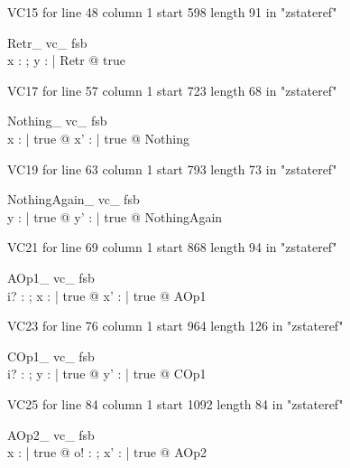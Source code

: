 \documentclass{article}
\begin{document}
VC15 for line 48 column 1 start 598 length 91 in "zstateref"
\begin{theorem}{ Retr\_ vc\_ fsb}\\
 \exists x : \power \nat ; y : \seq \nat | Retr @ true \\

\end{theorem}

VC17 for line 57 column 1 start 723 length 68 in "zstateref"
\begin{theorem}{ Nothing\_ vc\_ fsb}\\
 \forall x : \power \nat | true @ \exists x' : \power \nat | true @ Nothing \\

\end{theorem}

VC19 for line 63 column 1 start 793 length 73 in "zstateref"
\begin{theorem}{ NothingAgain\_ vc\_ fsb}\\
 \forall y : \seq \nat | true @ \exists y' : \seq \nat | true @ NothingAgain \\

\end{theorem}

VC21 for line 69 column 1 start 868 length 94 in "zstateref"
\begin{theorem}{ AOp1\_ vc\_ fsb}\\
 \forall i? : \nat ; x : \power \nat | true @ \exists x' : \power \nat | true @ AOp1 \\

\end{theorem}

VC23 for line 76 column 1 start 964 length 126 in "zstateref"
\begin{theorem}{ COp1\_ vc\_ fsb}\\
 \forall i? : \nat ; y : \seq \nat | true @ \exists y' : \seq \nat | true @ COp1 \\

\end{theorem}

VC25 for line 84 column 1 start 1092 length 84 in "zstateref"
\begin{theorem}{ AOp2\_ vc\_ fsb}\\
 \forall x : \power \nat | true @ \exists o! : \nat ; x' : \power \nat | true @ AOp2 \\

\end{theorem}
\end{document}
